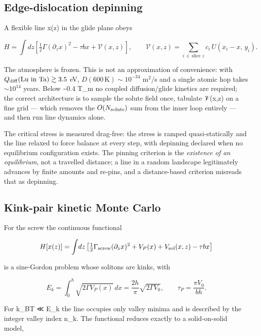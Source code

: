 \hypertarget{edge-dislocation-depinning}{%
\subsection{Edge-dislocation depinning}\label{sec:edge-dislocation-depinning}}

A flexible line x(z) in the glide plane obeys

\[H = \int\!dz\left[\tfrac12\Gamma(\partial_z x)^2 - \tau b x + \mathcal{V}(x,z)\right],\qquad \mathcal{V}(x,z) = \sum_{i\,\in\,\text{slice }z} c_i\,U(x_i - x,\,y_i).\]

The atmosphere is frozen. This is not an approximation of convenience: with \(Q_{\rm diff}(\mathrm{Lu\ in\ Ta})\gtrsim3.5\) eV, \(D(600\,\mathrm{K})\sim10^{-34}\) m\(^2\)/s and a single atomic hop takes \(\sim10^{14}\) years. Below \textasciitilde0.4 T\_m no coupled diffusion/glide kinetics are required; the correct architecture is to sample the solute field once, tabulate 𝒱(x,z) on a fine grid --- which removes the \(O(N_{\rm solute})\) sum from the inner loop entirely --- and then run line dynamics alone.

The critical stress is measured drag-free: the stress is ramped quasi-statically and the line relaxed to force balance at every step, with depinning declared when no equilibrium configuration exists. The pinning criterion is the \emph{existence of an equilibrium}, not a travelled distance; a line in a random landscape legitimately advances by finite amounts and re-pins, and a distance-based criterion misreads that as depinning.

\hypertarget{kink-pair-kinetic-monte-carlo}{%
\subsection{Kink-pair kinetic Monte Carlo}\label{sec:kink-pair-kinetic-monte-carlo}}

For the screw the continuous functional

\[H[x(z)] = \int\!dz\left[\tfrac12\Gamma_{\rm screw}(\partial_z x)^2 + V_P(x) + V_{\rm sol}(x,z) - \tau b x\right]\]

is a sine-Gordon problem whose solitons are kinks, with

\[E_k = \int_0^h\!\sqrt{2\Gamma V_P(x)}\,dx = \frac{2h}{\pi}\sqrt{2\Gamma V_0},\qquad \tau_P = \frac{\pi V_0}{bh}.\]

For k\_BT ≪ E\_k the line occupies only valley minima and is described by the integer valley index n\_k. The functional reduces exactly to a solid-on-solid model,

